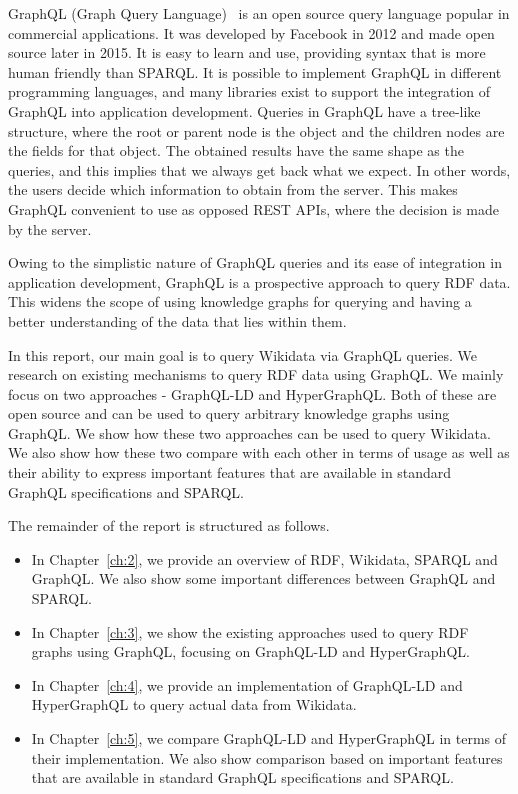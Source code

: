 GraphQL (Graph Query Language)~\cite{GraphQLa} is an open source query language popular in commercial applications. It was developed by Facebook in 2012 and made open source later in 2015. It is easy to learn and use, providing syntax that is more human friendly than SPARQL. It is possible to implement GraphQL in different programming languages, and many libraries exist to support the integration of GraphQL into application development. Queries in GraphQL have a tree-like structure, where the root or parent node is the object and the children nodes are the fields for that object. The obtained results have the same shape as the queries, and this implies that we always get back what we expect. In other words, the users decide which information to obtain from the server. This makes GraphQL convenient to use as opposed REST APIs, where the decision is made by the server. 

Owing to the simplistic nature of GraphQL queries and its ease of integration in application development, GraphQL is a prospective approach to query RDF data. This widens the scope of using knowledge graphs for querying and having a better understanding of the data that lies within them.

In this report, our main goal is to query Wikidata via GraphQL queries. We research on existing mechanisms to query RDF data using GraphQL. We mainly focus on two approaches - GraphQL-LD and HyperGraphQL. Both of these are open source and can be used to query arbitrary knowledge graphs using GraphQL. We show how these two approaches can be used to query Wikidata. We also show how these two compare with each other in terms of usage as well as their ability to express important features that are available in standard GraphQL specifications and SPARQL.


The remainder of the report is structured as follows.
\begin{itemize}
	\item In Chapter~\ref{ch:2}, we provide an overview of RDF, Wikidata, SPARQL and GraphQL. We also show some important differences between GraphQL and SPARQL. 
	\item In Chapter~\ref{ch:3}, we show the existing approaches used to query RDF graphs using GraphQL, focusing on GraphQL-LD and HyperGraphQL.
	\item In Chapter~\ref{ch:4}, we provide an implementation of GraphQL-LD and HyperGraphQL to query actual data from Wikidata.
	\item In Chapter~\ref{ch:5}, we compare GraphQL-LD and HyperGraphQL in terms of their implementation. We also show comparison based on important features that are available in standard GraphQL specifications and SPARQL.
\end{itemize}